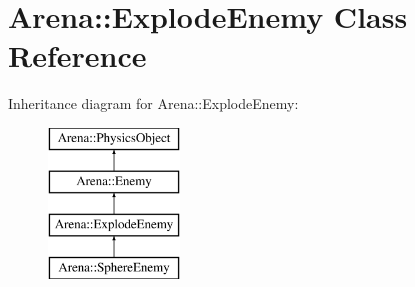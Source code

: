 \hypertarget{class_arena_1_1_explode_enemy}{\section{Arena\+:\+:Explode\+Enemy Class Reference}
\label{class_arena_1_1_explode_enemy}
}
Inheritance diagram for Arena\+:\+:Explode\+Enemy\+:\begin{figure}[H]
\begin{center}
\leavevmode
\includegraphics[height=4.000000cm]{class_arena_1_1_explode_enemy}
\end{center}
\end{figure}
